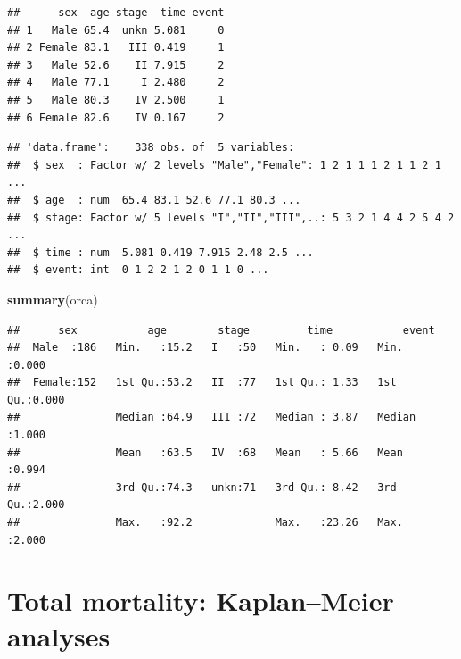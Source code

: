 \documentclass[
]{book}
\newenvironment{Shaded}{\begin{snugshade}}{\end{snugshade}}
\newcommand{\AttributeTok}[1]{\textcolor[rgb]{0.13,0.29,0.53}{#1}}
\newcommand{\FunctionTok}[1]{\textcolor[rgb]{0.13,0.29,0.53}{\textbf{#1}}}
\newcommand{\NormalTok}[1]{#1}
\newcommand{\OtherTok}[1]{\textcolor[rgb]{0.56,0.35,0.01}{#1}}
\newcommand{\SpecialCharTok}[1]{\textcolor[rgb]{0.81,0.36,0.00}{\textbf{#1}}}
\newcommand{\StringTok}[1]{\textcolor[rgb]{0.31,0.60,0.02}{#1}}
\begin{document}
\begin{verbatim}
##      sex  age stage  time event
## 1   Male 65.4  unkn 5.081     0
## 2 Female 83.1   III 0.419     1
## 3   Male 52.6    II 7.915     2
## 4   Male 77.1     I 2.480     2
## 5   Male 80.3    IV 2.500     1
## 6 Female 82.6    IV 0.167     2
\end{verbatim}

\begin{Shaded}
\end{Shaded}

\begin{verbatim}
## 'data.frame':    338 obs. of  5 variables:
##  $ sex  : Factor w/ 2 levels "Male","Female": 1 2 1 1 1 2 1 1 2 1 ...
##  $ age  : num  65.4 83.1 52.6 77.1 80.3 ...
##  $ stage: Factor w/ 5 levels "I","II","III",..: 5 3 2 1 4 4 2 5 4 2 ...
##  $ time : num  5.081 0.419 7.915 2.48 2.5 ...
##  $ event: int  0 1 2 2 1 2 0 1 1 0 ...
\end{verbatim}

\begin{Shaded}
\begin{Highlighting}[]
\FunctionTok{summary}\NormalTok{(orca)}
\end{Highlighting}
\end{Shaded}

\begin{verbatim}
##      sex           age        stage         time           event      
##  Male  :186   Min.   :15.2   I   :50   Min.   : 0.09   Min.   :0.000  
##  Female:152   1st Qu.:53.2   II  :77   1st Qu.: 1.33   1st Qu.:0.000  
##               Median :64.9   III :72   Median : 3.87   Median :1.000  
##               Mean   :63.5   IV  :68   Mean   : 5.66   Mean   :0.994  
##               3rd Qu.:74.3   unkn:71   3rd Qu.: 8.42   3rd Qu.:2.000  
##               Max.   :92.2             Max.   :23.26   Max.   :2.000
\end{verbatim}

\section{Total mortality: Kaplan--Meier analyses}\label{total-mortality-kaplanmeier-analyses}
\end{document}
